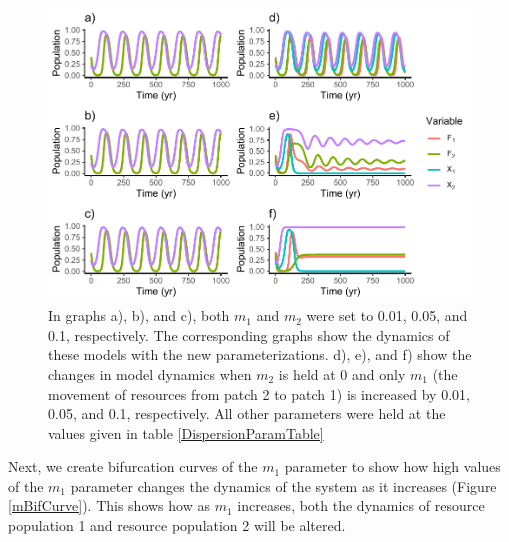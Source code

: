 \documentclass[
  12pt,
]{article}
\begin{document}
\begin{figure}
\centering
\includegraphics{Wulfing_CH2_Draft4_files/figure-latex/Movement-1.pdf}
\caption{\label{fig:Movement}In graphs a), b), and c), both \(m_1\) and \(m_2\) were set to 0.01, 0.05, and 0.1, respectively. The corresponding graphs show the dynamics of these models with the new parameterizations. d), e), and f) show the changes in model dynamics when \(m_2\) is held at 0 and only \(m_1\) (the movement of resources from patch 2 to patch 1) is increased by 0.01, 0.05, and 0.1, respectively. All other parameters were held at the values given in table \ref{DispersionParamTable} \label{Movement}}
\end{figure}

Next, we create bifurcation curves of the \(m_1\) parameter to show how high values of the \(m_1\) parameter changes the dynamics of the system as it increases (Figure \ref{mBifCurve}). This shows how as \(m_1\) increases, both the dynamics of resource population 1 and resource population 2 will be altered.
\end{document}
